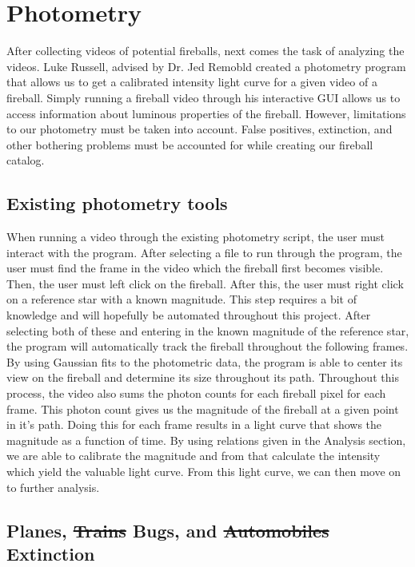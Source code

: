 \section{Photometry}
After collecting videos of potential fireballs, next comes the task of analyzing the videos.
Luke Russell, advised by Dr. Jed Remobld created a photometry program that allows us to get a calibrated intensity light curve for a given video of a fireball.
Simply running a fireball video through his interactive GUI allows us to access information about luminous properties of the fireball.
However, limitations to our photometry must be taken into account.
False positives, extinction, and other bothering problems must be accounted for while creating our fireball catalog.

\subsection{Existing photometry tools}
When running a video through the existing photometry script, the user must interact with the program.
After selecting a file to run through the program, the user must find the frame in the video which the fireball first becomes visible.  
Then, the user must left click on the fireball.
After this, the user must right click on a reference star with a known magnitude.
This step requires a bit of knowledge and will hopefully be automated throughout this project.
After selecting both of these and entering in the known magnitude of the reference star, the program will automatically track the fireball throughout the following frames.
By using Gaussian fits to the photometric data, the program is able to center its view on the fireball and determine its size throughout its path.
Throughout this process, the video also sums the photon counts for each fireball pixel for each frame.
This photon count gives us the magnitude of the fireball at a given point in it's path.
Doing this for each frame results in a light curve that shows the magnitude as a function of time.  
By using relations given in the Analysis section, we are able to calibrate the magnitude and from that calculate the intensity which yield the valuable light curve.
From this light curve, we can then move on to further analysis.

\subsection{Planes, \st{Trains} Bugs, and \st{Automobiles} Extinction}

